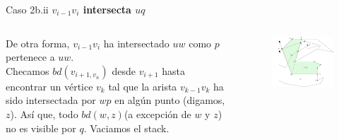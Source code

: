 \documentclass[aspectratio=169,xcolor=dvipsnames, t]{beamer}
\begin{document}
\begin{frame}{Caso 2b.ii}
  \textbf{$v_{i-1}v_{i}$ intersecta $uq$}\\
  \vspace{0.5cm}
  \begin{columns}
    \begin{column}{0.45\textwidth}
      De otra forma, $v_{i-1}v_{i}$ ha intersectado $uw$ como $p$ pertenece a $uw$.\\
      \vspace{0.5cm}
      Checamos $bd(v_{i+1, v_{n}})$ desde $v_{i+1}$ hasta encontrar un vértice $v_{k}$ tal que la arista $v_{k-1}v_{k}$ ha sido intersectada por $wp$ en algún punto (digamos, $z$). Así que, todo $bd(w,z)$(a excepción de $w$ y $z$) no es visible por $q$. Vaciamos el stack.\\
      \vspace{0.5cm}
    \end{column}
    \begin{column}{0.45\textwidth}  %
      \vspace{-2.5cm}
      \begin{figure}
        \centering
        \includegraphics[width=1\textwidth]{imagenes/Caso2.7b.png}
      \end{figure}
    \end{column}
  \end{columns}
\end{frame}

\end{document}
